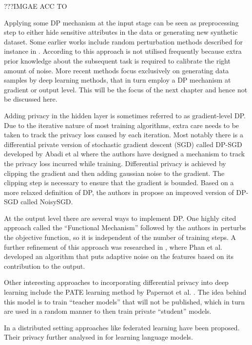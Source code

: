 ???IMGAE ACC TO \parencite{wang2023differential}

Applying some DP mechanism at the input stage can be seen as preprocessing step to either hide sensitive attributes in the data or generating new synthetic dataset. Some earlier works include random perturbation methods described for instance in \parencite{input_levelDP,erm_dp_input}. According to \parencite{wang2023differential} this approach is not utilised frequently because extra prior knowledge about the subsequent task is required to calibrate the right amount of noise. More recent methods focus exclusively on generating data samples by deep learning methods, that in turn employ a DP mechanism at gradient or output level. This will be the focus of the next chapter and hence not be discussed here.

Adding privacy in the hidden layer is sometimes referred to as gradient-level DP. Due to the iterative nature of most training algorithms, extra care needs to be taken to track the privacy loss caused by each iteration. Most notably there is a differential private version of stochastic gradient descent (SGD) called DP-SGD developed by Abadi et al \parencite{Abadi_2016} where the authors have designed a mechanism to track the privacy loss incurred while training. Differential privacy is achieved by clipping the gradient and then adding gaussian noise to the gradient. The clipping step is necessary to ensure that the gradient is bounded. Based on a more relaxed definition of DP, the authors in \parencite{bu2020deep} propose an improved version of DP-SGD called NoisySGD. 

At the output level there are several ways to implement DP. One highly cited approach called the ``Functional Mechanism'' followed by the authors in \parencite{zhang2012functional} perturbs the objective function, so it is independent of the number of training steps. A further refinement of this approach was researched in \parencite{adlm2017}, where Phan et al. developed an algorithm that puts adaptive noise on the features based on its contribution to the output.

Other interesting approaches to incorporating differential privacy into deep learning include the PATE learning method by Papernot et al. \parencite{papernot2017semisupervised}. The idea behind this model is to train ``teacher models'' that will not be published, which in turn are used in a random manner to then train private ``student'' models. 

In a distributed setting approaches like federated learning \parencite{konečný2015federated,Mo2019EfficientAP} have been proposed. Their privacy further analysed in \parencite{mcmahan2018learning} for learning language models.

